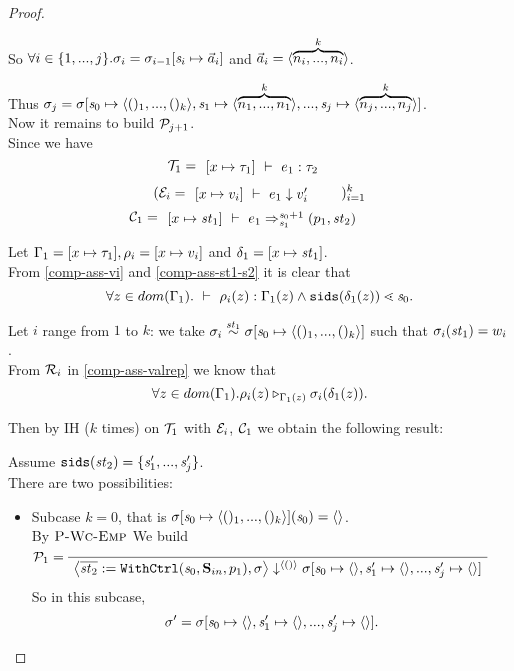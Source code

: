 \begin{proof}
\begin{itemize}
\begin{enumerate}[(i)]
  So $\forall i \in \{1,...,j\}. \sgm_i= \sgm_{i-1}[\s_i \|-> \a_i]$ and $\a_i = \< \overbrace{ n_i,...,n_i}^{k}\'>$.
  
  Thus $\sgm_j = \sgm[\s_0 \|-> \kunit, \s_1 \|-> \kn{1},..., \s_j \|-> \kn{j}]$.\\
	  
  Now it remains to build $\mathcal{P}_{j+1}$. \\
	Since we have 
	$$\MT_1 = \PT{\AC{\Type{[x \|-> {\tau_1}]}{e_1}{\tau_2}}}$$
	$$(\ME_i = \PT{\AC{\Eval{[x \|-> {v_i}]}{e_1}{v_i'}}})^k_{i=1} $$
	$$\MC_1 = \PT{\AC{\Trans{[x \|-> {\st_1}]}{e_1}{\s_0+1}{\s_1}{\sfun{p_1}{\st_2}}}}$$
	
	Let $\Gam_1 = [x \|-> \tau_1], \rho_i= [x \|-> v_i]$ and $\del_1 = [x \|-> \st_1]$. \\
	From \eqref{comp-ass-vi} and \eqref{comp-ass-st1-s2} it is clear that 
	$$\forall z \in dom(\Gam_1). \Type{}{\rho_i(z)}{\Gam_1(z)} \wedge 
	\sids{\del_1(z)} \.< \s_0 .$$
	
	Let $i$ range from $1$ to $k$: we take $\sgm_i \~{\st_1} \sgm[\s_0 \|-> \<()_1,...,()_k \'>]$ 
	such that $\sigma_i(\mathit{st}_1)= w_i$. \\
	From $\mathcal{R}_i$ in \eqref{comp-ass-valrep} we know that  
	$$\forall z \in dom(\Gamma_1). \rho_i(z) \triangleright_{\Gamma_1(z)} \sigma_i(\delta_1(z)).$$
	
	
	Then  by IH ($k$ times) on $\mathcal{T}_1$ with $\mathcal{E}_i$, 
	$\mathcal{C}_1$ we obtain the following result:


	Assume $\mathtt{sids}(\mathit{st}_2) = \{\mathit{s}'_1,...,\mathit{s}'_j\}$.\\
	
	There are two possibilities:
	\begin{itemize}
	\item 
	Subcase $k=0$, that is $\sgmsz(\s_0) = \emptyv$.\\
	By $\textsc{P-Wc-Emp}$ We build
	$$\PT{
		\AC{}
		\LeLa{\MP_1 = }
		\UC{\seval{\withctrl{\s_0}{p_1}{\Sin}{\overline{\st_2}}}{\sgm}{\< () \'>}
			{\sgm[\s_0 \|-> \emptyv, \s_1' \|-> \emptyv, ..., \s_j' \|-> \emptyv]}}
	  }$$ 
    So in this subcase, 
    $$\sgm' = \sgm[\s_0 \|-> \emptyv, \s_1' \|-> \emptyv, ..., \s_j' \|-> \emptyv].$$ 

\def\sgmpempty{\sgm[\s_0 \|-> \emptyv, \s_1' \|-> \emptyv, ..., \s_j' \|-> \emptyv]}


\end{itemize}
\end{enumerate}
\end{itemize}
\end{proof}
